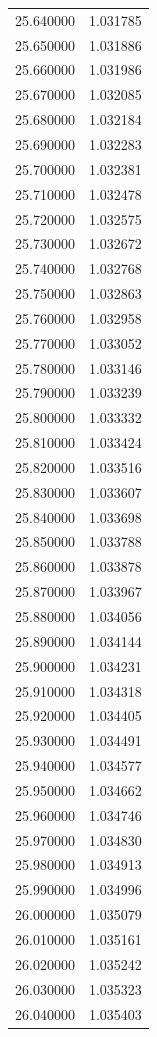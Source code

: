 \begin{tabular}{rr}
25.640000 & 1.031785 \\
25.650000 & 1.031886 \\
25.660000 & 1.031986 \\
25.670000 & 1.032085 \\
25.680000 & 1.032184 \\
25.690000 & 1.032283 \\
25.700000 & 1.032381 \\
25.710000 & 1.032478 \\
25.720000 & 1.032575 \\
25.730000 & 1.032672 \\
25.740000 & 1.032768 \\
25.750000 & 1.032863 \\
25.760000 & 1.032958 \\
25.770000 & 1.033052 \\
25.780000 & 1.033146 \\
25.790000 & 1.033239 \\
25.800000 & 1.033332 \\
25.810000 & 1.033424 \\
25.820000 & 1.033516 \\
25.830000 & 1.033607 \\
25.840000 & 1.033698 \\
25.850000 & 1.033788 \\
25.860000 & 1.033878 \\
25.870000 & 1.033967 \\
25.880000 & 1.034056 \\
25.890000 & 1.034144 \\
25.900000 & 1.034231 \\
25.910000 & 1.034318 \\
25.920000 & 1.034405 \\
25.930000 & 1.034491 \\
25.940000 & 1.034577 \\
25.950000 & 1.034662 \\
25.960000 & 1.034746 \\
25.970000 & 1.034830 \\
25.980000 & 1.034913 \\
25.990000 & 1.034996 \\
26.000000 & 1.035079 \\
26.010000 & 1.035161 \\
26.020000 & 1.035242 \\
26.030000 & 1.035323 \\
26.040000 & 1.035403 \\

\end{tabular}
